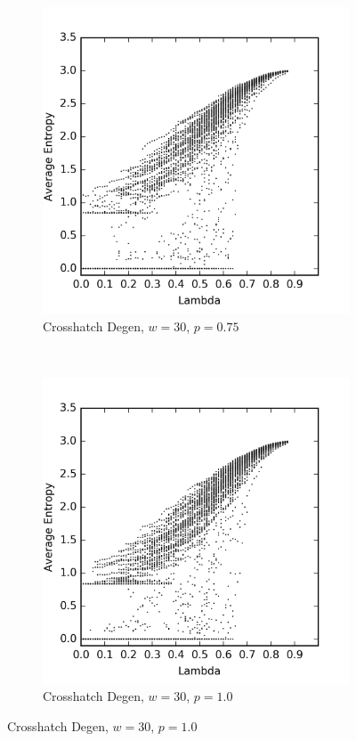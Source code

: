 \documentclass[a4paper,11pt]{article}
\begin{document}
\begin{figure}[htp]
\begin{subfigure}[t]{0.4\textwidth}
  \end{subfigure}

\begin{subfigure}[t]{0.4\textwidth}
  \centering
  \includegraphics[width=\textwidth]{ch6_figs/ch_w30_p75_entropy_scatter}
  \caption{Crosshatch Degen, $w=30$, $p=0.75$}

  \end{subfigure}
~
\begin{subfigure}[t]{0.4\textwidth}
  \centering
  \includegraphics[width=\textwidth]{ch6_figs/ch_w30_p100_entropy_scatter}
  \caption{Crosshatch Degen, $w=30$, $p=1.0$}
  \label{fig:lw_w30_p100}
  \end{subfigure}


\end{figure}
\end{document}
